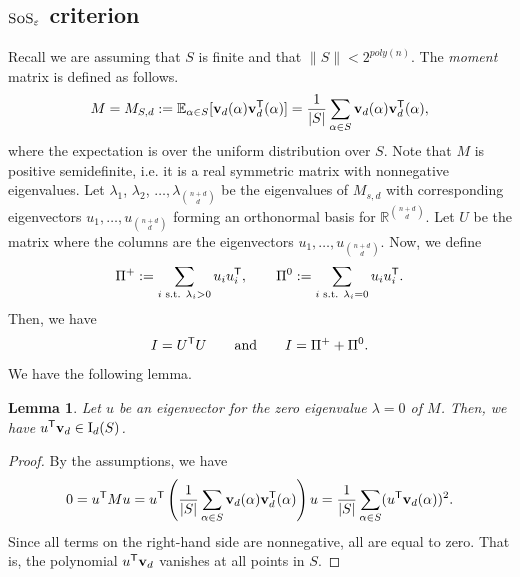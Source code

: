 \documentclass[11pt]{article}
\newcommand{\sos}{\text{\sc{SoS}}}
\newcommand{\I}{\emph{$\rm{I}$}}
\newcommand{\1}{\textbf{1}}
\newtheorem{lemma}[theorem]{Lemma}
\begin{document}
\subsection[SoS epsilon criterion]{$\sos_{\varepsilon}$ criterion}\label{sect:sos_criterion_subsection}
Recall we are assuming that $S$ is finite and that $\| S \| < 2^{poly(n)}$. The \emph{moment} matrix is defined as follows.
\begin{align}
M = M_{S,d} := \mathbb{E}_{\alpha \in S} [\mathbf{v}_d (\alpha) \mathbf{v}_d^{\sf{T}}(\alpha)] = \frac{1}{|S|}\sum_{\alpha\in S}\mathbf{v}_d (\alpha) \mathbf{v}_d^{\sf{T}}(\alpha),
\end{align}
where the expectation is over the uniform distribution over $S$. Note that $M$ is positive semidefinite, i.e. it is a real symmetric matrix with nonnegative eigenvalues. Let $\lambda_1$, $\lambda_2$, $\dots, \lambda_{\binom{n+d}{d}} $ be the eigenvalues of $M_{s,d}$ with corresponding eigenvectors $u_1, \dots, u_{\binom{n+d}{d}} $ forming an orthonormal basis for $\mathbb{R}^{\binom{n+d}{d}}$. Let $U$ be the matrix where the columns are the eigenvectors $u_1,\ldots,u_{\binom{n+d}{d}}$. 
Now, we define 
\begin{align}\label{Pi}
    \Pi^+ := \sum_{i \text{ s.t. } \lambda_i >0} u_i u_i^{\sf{T}}, \qquad \Pi^0 := \sum_{i \text{ s.t. } \lambda_i =0} u_i u_i^{\sf{T}}. 
\end{align}
    Then, we have 
    \begin{equation*}
        I = U^{\sf{T}} U \qquad \text{and} \qquad I = \Pi^+ + \Pi^0.
    \end{equation*}
We have the following lemma.
\begin{lemma}\label{th:eigen-to-ideal}
Let $u$ be an eigenvector for the zero eigenvalue $\lambda=0$ of $M$. Then, we have $u^{\sf{T}}\mathbf{v}_d\in \I_d(S)$.
\end{lemma} 
\begin{proof}
    By the assumptions, we have
    \begin{equation*}
        0=u^{\sf{T}} M u = u^{\sf{T}}\left(\frac{1}{|S|}\sum_{\alpha\in S}\mathbf{v}_d (\alpha) \mathbf{v}_d^{\sf{T}}(\alpha)\right)u=\frac{1}{|S|}\sum_{\alpha\in S}(u^{\sf{T}}\mathbf{v}_d(\alpha))^2.
    \end{equation*}
Since all terms on the right-hand side are nonnegative, all are equal to zero. That is, the polynomial $u^{\sf{T}} \mathbf{v}_d$ vanishes at all points in $S$.   
\end{proof}
\end{document}
